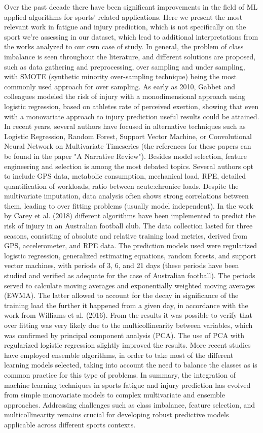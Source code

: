 \documentclass[conference]{IEEEtran}
\begin{document}
Over the past decade there have been significant improvements in the field of ML applied algorithms for sports' related applications. Here we present the most relevant work in fatigue and injury prediction, which is not specifically on the sport we're assessing in our dataset, which lead to additional interpretations from the works analyzed to our own case of study. In general, the problem of class imbalance is seen throughout the literature, and different solutions are proposed, such as data gathering and preprocessing, over sampling and under sampling, with SMOTE (synthetic minority over-sampling technique) being the most commonly used approach for over sampling. As early as 2010, Gabbet and colleagues modeled the risk of injury with a monodimensional approach using logistic regression, based on athletes rate of perceived exertion, showing that even with a monovariate approach to injury prediction useful results could be attained. In recent years, several authors have focused in alternative techniques such as Logistic Regression, Random Forest, Support Vector Machine, or Convolutional Neural Network on Multivariate Timeseries (the references for these papers can be found in the paper "A Narrative Review").
Besides model selection, feature engineering and selection is among the most debated topics. Several authors opt to include GPS data, metabolic consumption, mechanical load, RPE, detailed quantification of workloads, ratio between acute:chronice loads. Despite the multivariate imputation, data analysis often shows strong correlations between them, leading to over fitting problems (usually model independent).
In the work by Carey et al. (2018) different algorithms have been implemented to predict the risk of injury in an Australian football club. The data collection lasted for three seasons, consisting of absolute and relative training load metrics, derived from GPS, accelerometer, and RPE data. The prediction models used were regularized logistic regression, generalized estimating equations, random forests, and support vector machines, with periods of 3, 6, and 21 days (these periods have been studied and verified as adequate for the case of Australian football). The periods served to calculate moving averages and exponentially weighted moving averages (EWMA). The latter allowed to account for the decay in significance of the training load the further it happened from a given day, in accordance with the work from Williams et al. (2016). From the results it was possible to verify that over fitting was very likely due to the multicollinearity between variables, which was confirmed by principal component analysis (PCA). The use of PCA with regularized logistic regression slightly improved the results.
More recent studies have employed ensemble algorithms, in order to take most of the different learning models selected, taking into account the need to balance the classes as is common practice for this type of problems. 
In summary, the integration of machine learning techniques in sports fatigue and injury prediction has evolved from simple monovariate models to complex multivariate and ensemble approaches. Addressing challenges such as class imbalance, feature selection, and multicollinearity remains crucial for developing robust predictive models applicable across different sports contexts.
\end{document}
